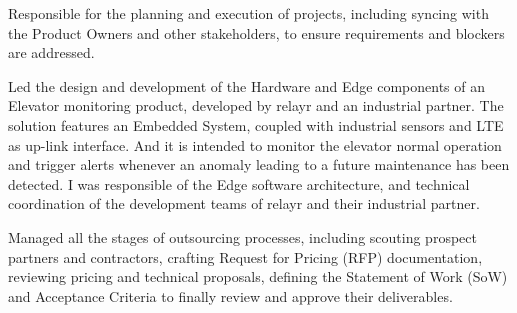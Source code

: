 \begin{cventries}
{\begin{cvitems}
        \item {Responsible for the planning and execution of projects, including syncing with the Product Owners and other stakeholders, to ensure requirements and blockers are addressed.}
        \item {Led the design and development of the Hardware and Edge components of an Elevator monitoring product, developed by relayr and an industrial partner.  The solution features an Embedded System, coupled with industrial sensors and LTE as up-link interface.  And it is intended to monitor the elevator normal operation and trigger alerts whenever an anomaly leading to a future maintenance has been detected.  I was responsible of the Edge software architecture, and technical coordination of the development teams of relayr and their industrial partner.}
        \item {Managed all the stages of outsourcing processes, including scouting prospect partners and contractors, crafting Request for Pricing (RFP) documentation, reviewing pricing and technical proposals, defining the Statement of Work (SoW) and Acceptance Criteria to finally review and approve their deliverables.}
      \end{cvitems}
    }


\end{cventries}
